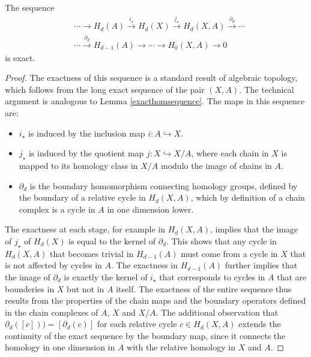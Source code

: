 \begin{corollary}{\cite[Theorem 2.16]{hatcher2005algebraic}}
	The sequence
	\begin{align}
		  & \cdots \rightarrow H_{d}(A) \xrightarrow{i_\star}H_{d}(X) \xrightarrow{j_\star} 
		H_{d}(X,A) \xrightarrow{\partial_d} \cdots \nonumber\\
		  & \cdots \xrightarrow{\partial_d} H_{d-1}(A) \rightarrow \cdots \rightarrow       
		H_{0}(X,A) \rightarrow 0
	\end{align}
	is exact.
\end{corollary}

\begin{proof}
	The exactness of this sequence is a standard result of algebraic topology, which follows from the long exact sequence of the pair \((X, A)\). The technical argument is analogous to Lemma \ref{exacthomsequence}. The maps in this sequence are:
	\begin{itemize}
		\item \(i_{\star}\) is induced by the inclusion map \(i: A \hookrightarrow X\).
		\item \(j_{\star}\) is induced by the quotient map \(j: X \hookrightarrow X/A\), where each chain in \(X\) is mapped to its homology class in \(X/A\) modulo the image of chains in \(A\).
		\item \(\partial_{d}\) is the boundary homomorphism connecting homology groups, defined by the boundary of a relative cycle in \(H_{d}(X, A)\), which by definition of a chain complex is a cycle in \(A\) in one dimension lower.
	\end{itemize}
	The exactness at each stage, for example in \(H_{d}(X, A)\), implies that the image of \(j_{\star}\) of \(H_{d}(X)\) is equal to the kernel of \(\partial_{d}\). This shows that any cycle in \(H_{d}(X, A)\) that becomes trivial in \(H_{d-1}(A)\) must come from a cycle in \(X\) that is not affected by cycles in \(A\). The exactness in \(H_{d-1}(A)\) further implies that the image of \(\partial_{d}\) is exactly the kernel of \(i_{\star}\) that corresponds to cycles in \(A\) that are bounderies in \(X\) but not in \(A\) itself. The exactness of the entire sequence thus results from the properties of the chain maps and the boundary operators defined in the chain complexes of \(A\), \(X\) and \(X/A\). The additional observation that \(\partial_{d}([c])) = [\partial_{d}(c)]\) for each relative cycle \(c \in H_{d}(X, A)\) extends the continuity of the exact sequence by the boundary map, since it connects the homology in one dimension in \(A\) with the relative homology in \(X\) and \(A\).
\end{proof}


